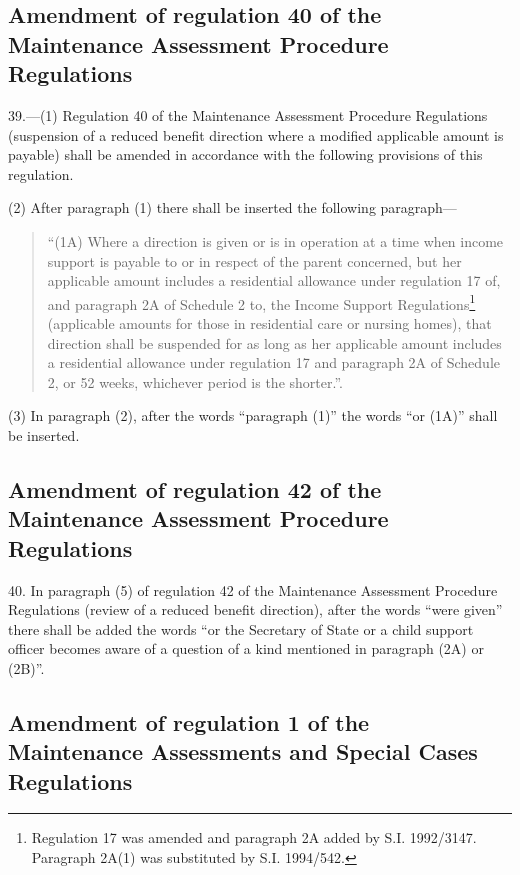 \documentclass[a4paper]{article}
\begin{document}
\subsection[39. Amendment of regulation 40 of the Maintenance Assessment Procedure Regulations]{Amendment of regulation 40 of the Maintenance Assessment Procedure Regulations}

39.—(1) Regulation 40 of the Maintenance Assessment Procedure Regulations (suspension of a reduced benefit direction where a modified applicable amount is payable) shall be amended in accordance with the following provisions of this regulation.

(2) After paragraph (1) there shall be inserted the following paragraph—
\begin{quotation}
“(1A) Where a direction is given or is in operation at a time when income support is payable to or in respect of the parent concerned, but her applicable amount includes a residential allowance under regulation 17 of, and paragraph 2A of Schedule 2 to, the Income Support Regulations\footnote{\frenchspacing Regulation 17 was amended and paragraph 2A added by S.I. 1992/3147. Paragraph 2A(1) was substituted by S.I. 1994/542.} (applicable amounts for those in residential care or nursing homes), that direction shall be suspended for as long as her applicable amount includes a residential allowance under regulation 17 and paragraph 2A of Schedule 2, or 52 weeks, whichever period is the shorter.”.
\end{quotation}

(3) In paragraph (2), after the words “paragraph (1)” the words “or (1A)” shall be inserted.

\subsection[40. Amendment of regulation 42 of the Maintenance Assessment Procedure Regulations]{Amendment of regulation 42 of the Maintenance Assessment Procedure Regulations}

40.  In paragraph (5) of regulation 42 of the Maintenance Assessment Procedure Regulations (review of a reduced benefit direction), after the words “were given” there shall be added the words “or the Secretary of State or a child support officer becomes aware of a question of a kind mentioned in paragraph (2A) or (2B)”.

\subsection[41. Amendment of regulation 1 of the Maintenance Assessments and Special Cases Regulations]{Amendment of regulation 1 of the Maintenance Assessments and Special Cases Regulations}
\end{document}
